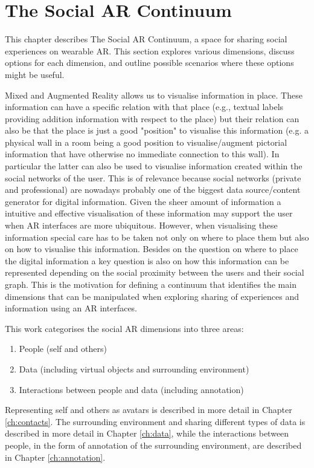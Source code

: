\chapter{The Social AR Continuum}
\label{ch:continuum}

This chapter describes The Social AR Continuum, a space for sharing social experiences on wearable AR. This section explores various dimensions, discuss options for each dimension, and outline possible scenarios where these options might be useful.

Mixed and Augmented Reality allows us to visualise information in place. These information can have a specific relation with that place (e.g., textual labels providing addition information with respect to the place) but their relation can also be that the place is just a good "position" to visualise this information (e.g. a physical wall in a room being a good position to visualise/augment pictorial information that have otherwise no immediate connection to this wall). In particular the latter can also be used to visualise information created within the social networks of the user. This is of relevance because social networks (private and professional) are nowadays probably one of the biggest data source/content generator for digital information. Given the sheer amount of information a intuitive and effective visualisation of these information may support the user when AR interfaces are more ubiquitous. However, when visualising these information special care has to be taken not only on where to place them but also on how to visualise this information. Besides on the question on where to place the digital information a key question is also on how this information can be represented depending on the social proximity between the users and their social graph. This is the motivation for defining a continuum that identifies the main dimensions that can be manipulated when exploring sharing of experiences and information using an AR interfaces. 

This work categorises the social AR dimensions into three areas: 
\begin{enumerate}
    \item People (self and others)
    \item Data (including virtual objects and surrounding environment)
    \item Interactions between people and data (including annotation)
\end{enumerate}

Representing self and others as avatars is described in more detail in Chapter \ref{ch:contacts}. The surrounding environment and sharing different types of data is described in more detail in Chapter \ref{ch:data}, while the interactions between people, in the form of annotation of the surrounding environment, are described in Chapter \ref{ch:annotation}.

